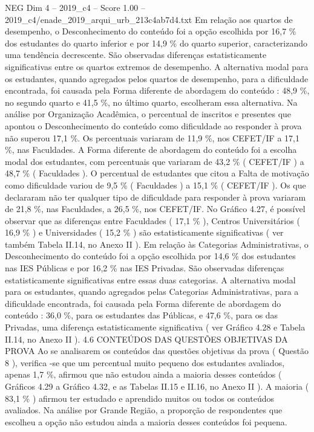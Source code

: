 \begin{textsample}{NEG Dim 4 – 2019\_c4 – Score 1.00 – 2019\_c4/enade\_2019\_arqui\_urb\_213c4ab7d4.txt}
Em relação aos quartos de desempenho, o Desconhecimento do conteúdo foi a opção escolhida por 16,7 \% dos estudantes do quarto inferior e por 14,9 \% do quarto superior, caracterizando uma tendência decrescente.
São observadas diferenças estatisticamente significativas entre os quartos extremos de desempenho.
A alternativa modal para os estudantes, quando agregados pelos quartos de desempenho, para a dificuldade encontrada, foi causada pela Forma diferente de abordagem do conteúdo : 48,9 \%, no segundo quarto e 41,5 \%, no último quarto, escolheram essa alternativa.
Na análise por Organização Acadêmica, o percentual de inscritos e presentes que apontou o Desconhecimento do conteúdo como dificuldade ao responder à prova não superou 17,1 \%.
Os percentuais variaram de 11,9 \%, nos CEFET/IF a 17,1 \%, nas Faculdades.
A Forma diferente de abordagem do conteúdo foi a escolha modal dos estudantes, com percentuais que variaram de 43,2 \% ( CEFET/IF ) a 48,7 \% ( Faculdades ).
O percentual de estudantes que citou a Falta de motivação como dificuldade variou de 9,5 \% ( Faculdades ) a 15,1 \% ( CEFET/IF ).
Os que declararam não ter qualquer tipo de dificuldade para responder à prova variaram de 21,8 \%, nas Faculdades, a 26,5 \%, nos CEFET/IF.
No Gráfico 4.27, é possível observar que as diferenças entre Faculdades ( 17,1 \% ), Centros Universitários ( 16,9 \% ) e Universidades ( 15,2 \% ) são estatisticamente significativas ( ver também Tabela II.14, no Anexo II ).
Em relação às Categorias Administrativas, o Desconhecimento do conteúdo foi a opção escolhida por 14,6 \% dos estudantes nas IES Públicas e por 16,2 \% nas IES Privadas.
São observadas diferenças estatisticamente significativas entre essas duas categorias.
A alternativa modal para os estudantes, quando agregados pelas Categorias Administrativas, para a dificuldade encontrada, foi causada pela Forma diferente de abordagem do conteúdo : 36,0 \%, para os estudantes das Públicas, e 47,6 \%, para os das Privadas, uma diferença estatisticamente significativa ( ver Gráfico 4.28 e Tabela II.14, no Anexo II ). 4.6 CONTEÚDOS DAS QUESTÕES OBJETIVAS DA PROVA Ao se analisarem os conteúdos das questões objetivas da prova ( Questão 8 ), verifica -se que um percentual muito pequeno dos estudantes avaliados, apenas 1,7 \%, afirmou que não estudou ainda a maioria desses conteúdos ( Gráficos 4.29 a Gráfico 4.32, e as Tabelas II.15 e II.16, no Anexo II ).
A maioria ( 83,1 \% ) afirmou ter estudado e aprendido muitos ou todos os conteúdos avaliados.
Na análise por Grande Região, a proporção de respondentes que escolheu a opção não estudou ainda a maioria desses conteúdos foi pequena.

\end{textsample}
